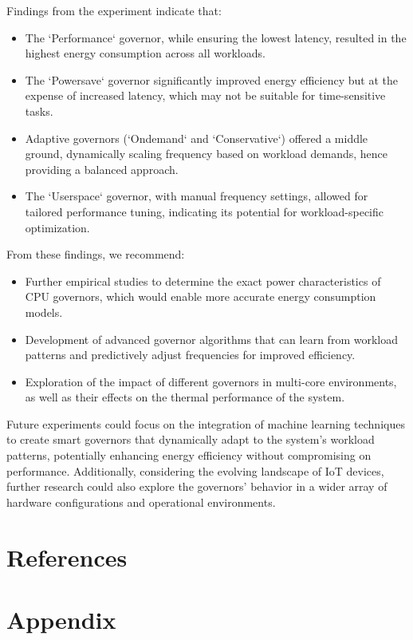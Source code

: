 \documentclass[conference]{IEEEtran}
\begin{document}
Findings from the experiment indicate that:
\begin{itemize}
    \item The `Performance` governor, while ensuring the lowest latency, resulted in the highest energy consumption across all workloads.
    \item The `Powersave` governor significantly improved energy efficiency but at the expense of increased latency, which may not be suitable for time-sensitive tasks.
    \item Adaptive governors (`Ondemand` and `Conservative`) offered a middle ground, dynamically scaling frequency based on workload demands, hence providing a balanced approach.
    \item The `Userspace` governor, with manual frequency settings, allowed for tailored performance tuning, indicating its potential for workload-specific optimization.
\end{itemize}

From these findings, we recommend:
\begin{itemize}
    \item Further empirical studies to determine the exact power characteristics of CPU governors, which would enable more accurate energy consumption models.
    \item Development of advanced governor algorithms that can learn from workload patterns and predictively adjust frequencies for improved efficiency.
    \item Exploration of the impact of different governors in multi-core environments, as well as their effects on the thermal performance of the system.
\end{itemize}

Future experiments could focus on the integration of machine learning techniques to create smart governors that dynamically adapt to the system's workload patterns, potentially enhancing energy efficiency without compromising on performance. Additionally, considering the evolving landscape of IoT devices, further research could also explore the governors' behavior in a wider array of hardware configurations and operational environments.


\section{References}
\nocite{*}  
\printbibliography[heading=none]
\section{Appendix}
\end{document}
